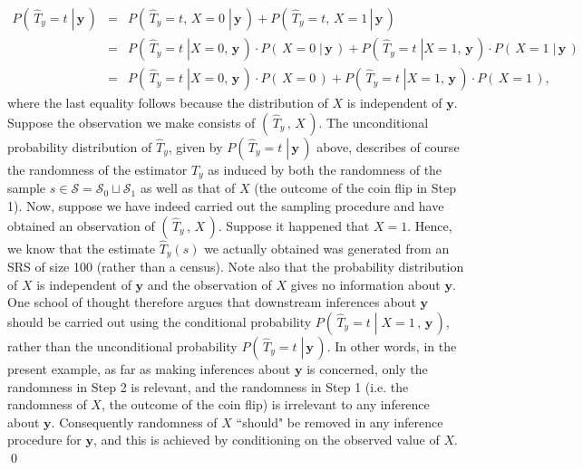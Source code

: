 \documentclass{article}
\begin{document}
\begin{eqnarray*}
P\left(\,\left.\widehat{T}_{y} = t\;\right\vert\,\mathbf{y}\,\right)
&=& P\left(\,\left.\widehat{T}_{y} = t,\,X = 0\;\right\vert\,\mathbf{y}\,\right) + P\left(\,\left.\widehat{T}_{y} = t,\,X = 1\,\right\vert\,\mathbf{y}\,\right) \\
&=& P\left(\,\left.\widehat{T}_{y} = t\;\right\vert X = 0,\,\mathbf{y}\,\right)\cdot P\left(\,\left.X = 0\;\right\vert\,\mathbf{y}\,\right)
	+ P\left(\,\left.\widehat{T}_{y} = t\;\right\vert X = 1,\,\mathbf{y}\,\right)\cdot P\left(\,\left.X = 1\;\right\vert\,\mathbf{y}\,\right) \\
&=& P\left(\,\left.\widehat{T}_{y} = t\;\right\vert X = 0,\,\mathbf{y}\,\right)\cdot P\left(\,X = 0\,\right)
	+ P\left(\,\left.\widehat{T}_{y} = t\;\right\vert X = 1,\,\mathbf{y}\,\right)\cdot P\left(\,X = 1\,\right),
\end{eqnarray*}
where the last equality follows because the distribution of $X$ is independent of $\mathbf{y}$.
Suppose the observation we make consists of $\left(\,\widehat{T}_{y}\,,\,X\,\right)$.
The unconditional probability distribution of $\widehat{T}_{y}$,
given by $P\left(\,\left.\widehat{T}_{y} = t\;\right\vert\,\mathbf{y}\,\right)$ above,
describes of course the randomness of the estimator $\widehat{T}_{y}$ as induced
by both the randomness of the sample
$s \in \mathcal{S} = \mathcal{S}_{0} \sqcup \mathcal{S}_{1}$
as well as that of $X$ (the outcome of the coin flip in Step 1).
Now, suppose we have indeed carried out the sampling procedure and have obtained
an observation of $\left(\,\widehat{T}_{y}\,,\,X\,\right)$.
Suppose it happened that $X = 1$.
Hence, we know that the estimate $\widehat{T}_{y}(s)$ we actually obtained
was generated from an SRS of size 100 (rather than a census).
Note also that the probability distribution of $X$ is independent of $\mathbf{y}$
and the observation of $X$ gives no information about $\mathbf{y}$.
{\color{red}One school of thought therefore argues that downstream inferences
about $\mathbf{y}$ should be carried out using the conditional probability
$P\!\left(\,\left.\widehat{T}_{y} = t\;\right\vert\;X = 1\,,\,\mathbf{y}\,\right)$,
rather than the unconditional probability
$P\left(\,\left.\widehat{T}_{y} = t\;\right\vert\,\mathbf{y}\,\right)$.}
In other words, in the present example, as far as making inferences about $\mathbf{y}$
is concerned, only the randomness in Step 2 is relevant, and the randomness in Step 1
(i.e. the randomness of $X$, the outcome of the coin flip) is irrelevant to any inference
about $\mathbf{y}$. Consequently randomness of $X$ ``should" be removed in any
inference procedure for $\mathbf{y}$, and this is achieved by conditioning on the
observed value of $X$. \qed
\end{document}
